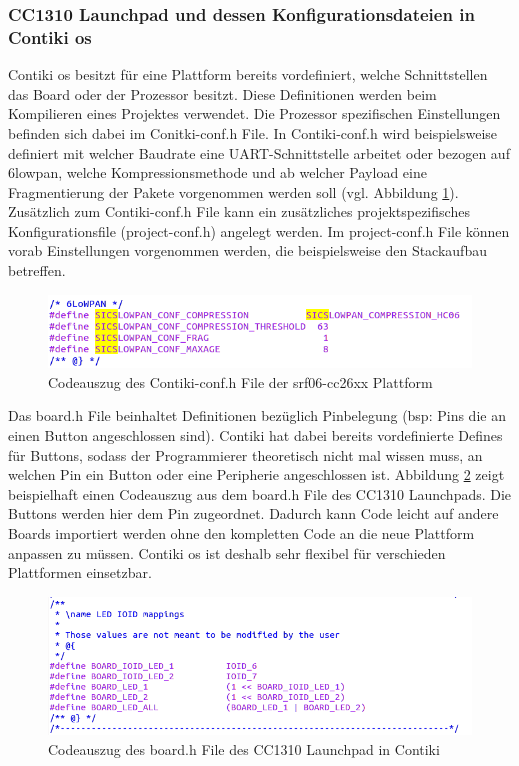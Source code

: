 	\subsubsection{CC1310 Launchpad und dessen Konfigurationsdateien in Contiki \ac{os}}
	Contiki \ac{os} besitzt für eine Plattform bereits vordefiniert, welche Schnittstellen das Board oder der Prozessor besitzt. Diese Definitionen werden beim Kompilieren eines Projektes verwendet. Die Prozessor spezifischen Einstellungen befinden sich dabei im Conitki-conf.h File. In Contiki-conf.h wird beispielsweise definiert mit welcher Baudrate eine UART-Schnittstelle arbeitet oder bezogen auf \ac{6lowpan}, welche Kompressionsmethode und ab welcher Payload eine Fragmentierung der Pakete vorgenommen werden soll (vgl. Abbildung \ref{Contiki-conf}).\\
	Zusätzlich zum Contiki-conf.h File kann ein zusätzliches projektspezifisches Konfigurationsfile (project-conf.h) angelegt werden. Im project-conf.h File können vorab Einstellungen vorgenommen werden, die  beispielsweise den Stackaufbau betreffen.
	\begin{figure}
		\centering
		\includegraphics[scale=0.5]{Grafiken-Julian/Contiki_conf.png}
		\caption{Codeauszug des Contiki-conf.h File der srf06-cc26xx Plattform}
		\label{Contiki-conf}
	\end{figure}
	Das board.h File beinhaltet Definitionen bezüglich Pinbelegung (bsp: Pins die an einen Button angeschlossen sind). Contiki hat dabei bereits vordefinierte Defines für Buttons, sodass der Programmierer theoretisch nicht mal wissen muss, an welchen Pin ein Button oder eine Peripherie angeschlossen ist. Abbildung \ref{Boardfiles} zeigt beispielhaft einen Codeauszug aus dem board.h File des CC1310 Launchpads. Die Buttons werden hier dem Pin zugeordnet. Dadurch kann Code leicht auf andere Boards importiert werden ohne den kompletten Code an die neue Plattform anpassen zu müssen. Contiki \ac{os} ist deshalb sehr flexibel für verschieden Plattformen einsetzbar.\\
	\begin{figure}
		\centering
		\includegraphics[scale=0.5]{Grafiken-Julian/Boardfiles.png}
		\caption{Codeauszug des board.h File des CC1310 Launchpad in Contiki}
		\label{Boardfiles}
	\end{figure}
